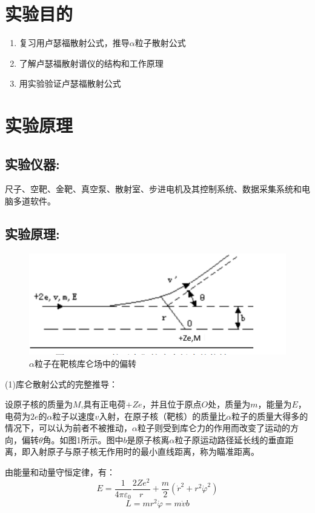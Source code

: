 \documentclass[utf8]{ctexart}
\begin{document}
\section*{实验目的}
\begin{enumerate}
	\item 
	复习用卢瑟福散射公式，推导$\alpha$粒子散射公式
	\item 
	了解卢瑟福散射谱仪的结构和工作原理
	\item 
	用实验验证卢瑟福散射公式
\end{enumerate}



\section*{实验原理}
\subsection*{实验仪器:} 
\par
尺子、空靶、金靶、真空泵、散射室、步进电机及其控制系统、数据采集系统和电脑多道软件。
\subsection*{实验原理\cite{bk1}:}
\begin{figure}
	\centering
	\includegraphics[scale=0.7]{1.1.png}
	\caption{$\alpha$粒子在靶核库仑场中的偏转}
\end{figure}
(1)库仑散射公式的完整推导：
\par
设原子核的质量为$M$,具有正电荷$+Ze$，并且位于原点$O$处，质量为$m$，能量为$E$，电荷为$2e$的$\alpha$粒子以速度$v$入射，在原子核（靶核）的质量比$\alpha$粒子的质量大得多的情况下，可以认为前者不被推动，$\alpha$粒子则受到库仑力的作用而改变了运动的方向，偏转$\theta$角。如图1所示。图中$b$是原子核离$\alpha$粒子原运动路径延长线的垂直距离，即入射原子与原子核无作用时的最小直线距离，称为瞄准距离。

由能量和动量守恒定律，有：
\begin{equation}
	E = \frac{1}{4\pi\varepsilon_0}\frac{2Ze^2}{r}+\frac{m}{2}(\dot{r}^2+r^2\dot\varphi^2)
\end{equation}
\begin{equation}
	L = mr^2\dot\varphi = m \dot{v}b
\end{equation}
\end{document}
